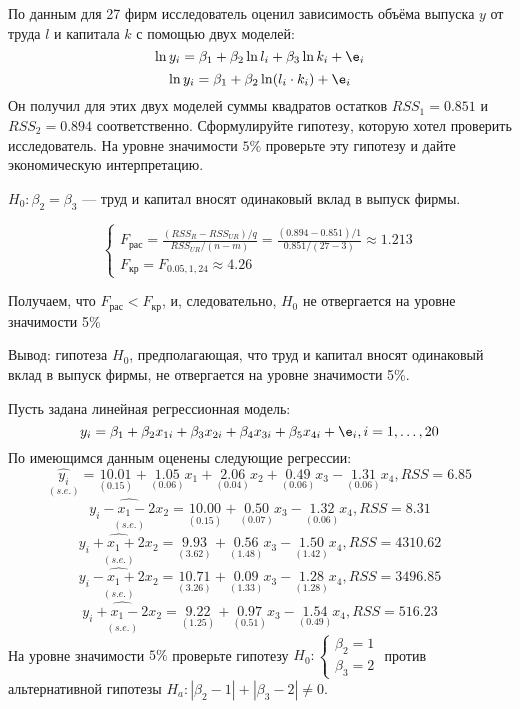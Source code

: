 \documentclass[pdftex,11pt,openany]{book}\usepackage[]{graphicx}\usepackage[]{color}
\begin{document}
\begin{solution}
\end{solution}


\begin{problem} %
 По данным для 27 фирм исследователь оценил зависимость объёма выпуска $y$ от труда $l$ и капитала $k$ с помощью двух моделей:
\[
\ln y_i = \beta_1 + \beta_2 \ln l_i + \beta_3 \ln k_i + \e_i
\]
\[
\ln y_i = \beta_1 + \beta_2 \ln (l_i \cdot k_i) + \e_i
\]
Он получил для этих двух моделей суммы квадратов остатков $RSS_1 = 0.851$ и $RSS_2 = 0.894$ соответственно. Сформулируйте гипотезу, которую хотел проверить исследователь. На уровне значимости $5\%$ проверьте эту гипотезу и дайте экономическую интерпретацию.
\end{problem}

\begin{solution}
$H_0: \beta_2=\beta_3$ --- труд и капитал вносят одинаковый вклад в выпуск фирмы.

\[
\begin{cases}
F_{\text{рас}}=\frac{(RSS_R-RSS_{UR})/q}{RSS_{UR}/(n-m)}=\frac{(0.894-0.851)/1}{0.851/(27-3)}\approx 1.213\\
F_{\text{кр}}= F_{0.05,1,24}\approx 4.26
\end{cases}
\]

Получаем, что $F_{\text{рас}}<F_{\text{кр}}$, и, следовательно, $H_0$ не отвергается на уровне значимости 5\%

Вывод: гипотеза $H_0$, предполагающая, что труд и капитал вносят одинаковый вклад в выпуск фирмы, не отвергается на уровне значимости 5\%.
\end{solution}


\begin{problem} %
 Пусть задана линейная регрессионная модель:
\[
y_i = \beta_1 + \beta_2 x_{1i} + \beta_3 x_{2i} + \beta_4 x_{3i} + \beta_5 x_{4i} + \e_i, i = 1, \dots, 20
\]
По имеющимся данным оценены следующие регрессии:
\[
\underset{(s.e.)}{\hat{y_i}} = \underset{(0.15)}{10.01} + \underset{(0.06)}{1.05}x_1 + \underset{(0.04)}{2.06}x_2 + \underset{(0.06)}{0.49}x_3 - \underset{(0.06)}{1.31}x_4, RSS = 6.85
\]
\[
\underset{(s.e.)}{\widehat{y_i- x_1 - 2x_2}} = \underset{(0.15)}{10.00} + \underset{(0.07)}{0.50}x_3 - \underset{(0.06)}{1.32}x_4, RSS = 8.31 
\]
\[
\underset{(s.e.)}{\widehat{y_i + x_1 + 2x_2}} = \underset{(3.62)}{9.93} + \underset{(1.48)}{0.56}x_3 - \underset{(1.42)}{1.50}x_4, RSS = 4310.62 
\]
\[
\underset{(s.e.)}{\widehat{y_i - x_1 + 2x_2}} = \underset{(3.26)}{10.71} + \underset{(1.33)}{0.09}x_3 - \underset{(1.28)}{1.28}x_4, RSS = 3496.85
\]
\[
\underset{(s.e.)}{\widehat{y_i + x_1 - 2x_2}} = \underset{(1.25)}{9.22} + \underset{(0.51)}{0.97}x_3 - \underset{(0.49)}{1.54}x_4, RSS = 516.23
\]
На уровне значимости $5\%$ проверьте гипотезу $H_0: \begin{cases} \beta_2 = 1 \\ \beta_3 = 2 \end{cases}$ против альтернативной гипотезы $H_a: |\beta_2 - 1| + |\beta_3 - 2| \not= 0$.
\end{problem}
\end{document}
